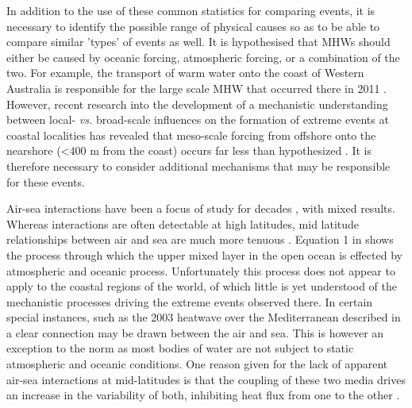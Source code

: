 \documentclass[a4paper,10pt,review]{elsarticle}
\begin{document}
In addition to the use of these common statistics for comparing events, it is necessary to identify the possible range of physical causes so as to be able to compare similar 'types' of events as well. It is hypothesised that MHWs should either be caused by oceanic forcing, atmospheric forcing, or a combination of the two. For example, the transport of warm water onto the coast of Western Australia is responsible for the large scale MHW that occurred there in 2011 \citep{Feng2013, Benthuysen2014}. However, recent research into the development of a mechanistic understanding between local- \emph{vs.} broad-scale influences on the formation of extreme events at coastal localities has revealed that meso-scale forcing from offshore onto the nearshore (<400 m from the coast) occurs far less than hypothesized \citep{Schlegel2016}. It is therefore necessary to consider additional mechanisms that may be responsible for these events. 

Air-sea interactions have been a focus of study for decades \citep{Frankignoul1985}, with mixed results. Whereas interactions are often detectable at high latitudes, mid latitude relationships between air and sea are much more tenuous \citep{Krishnamurti1988}. Equation 1 in \citet{Deser2010} shows the process through which the upper mixed layer in the open ocean is effected by atmospheric and oceanic process. Unfortunately this process does not appear to apply to the coastal regions of the world, of which little is yet understood of the mechanistic processes driving the extreme events observed there. In certain special instances, such as the 2003 heatwave over the Mediterranean described in \citet{Garrabou2009} a clear connection may be drawn between the air and sea. This is however an exception to the norm as most bodies of water are not subject to static atmospheric and oceanic conditions. One reason given for the lack of apparent air-sea interactions at mid-latitudes is that the coupling of these two media drives an increase in the variability of both, inhibiting heat flux from one to the other \citep{Barsugli1998}.
\end{document}
